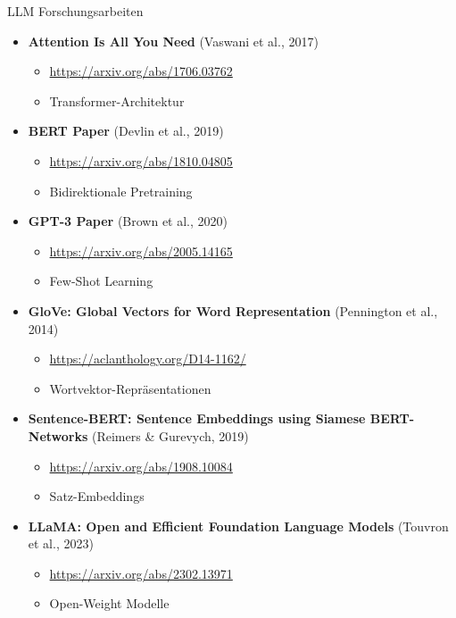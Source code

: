 \documentclass[aspectratio=1610, xcolor=dvipsnames, 9pt]{beamer}
\begin{document}
\begin{frame}{LLM Forschungsarbeiten}
\begin{itemize}
\item \textbf{Attention Is All You Need} (Vaswani et al., 2017)
\begin{itemize}
\item \url{https://arxiv.org/abs/1706.03762}
\item Transformer-Architektur
\end{itemize}

\item \textbf{BERT Paper} (Devlin et al., 2019)
\begin{itemize}
\item \url{https://arxiv.org/abs/1810.04805}
\item Bidirektionale Pretraining
\end{itemize}

\item \textbf{GPT-3 Paper} (Brown et al., 2020)
\begin{itemize}
\item \url{https://arxiv.org/abs/2005.14165}
\item Few-Shot Learning
\end{itemize}

\item \textbf{GloVe: Global Vectors for Word Representation} (Pennington et al., 2014)
\begin{itemize}
\item \url{https://aclanthology.org/D14-1162/}
\item Wortvektor-Repräsentationen
\end{itemize}

\item \textbf{Sentence-BERT: Sentence Embeddings using Siamese BERT-Networks} (Reimers \& Gurevych, 2019)
\begin{itemize}
\item \url{https://arxiv.org/abs/1908.10084}
\item Satz-Embeddings
\end{itemize}

\item \textbf{LLaMA: Open and Efficient Foundation Language Models} (Touvron et al., 2023)
\begin{itemize}
\item \url{https://arxiv.org/abs/2302.13971}
\item Open-Weight Modelle
\end{itemize}
\end{itemize}
\end{frame}
\end{document}

